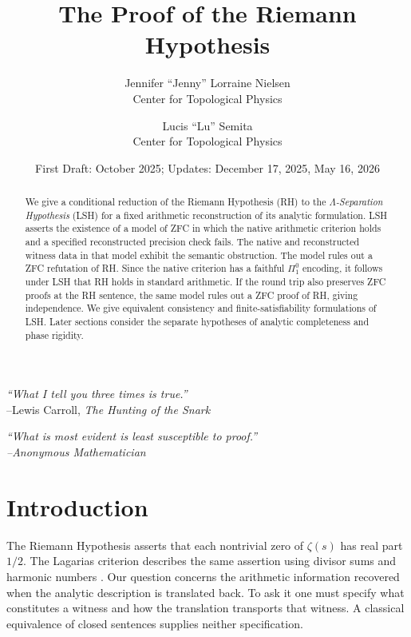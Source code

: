\documentclass{article}
\title{\textbf{The Proof of the Riemann Hypothesis}}
\author{
  Jennifer ``Jenny'' Lorraine Nielsen \\
  \small Center for Topological Physics\\
  \and
  Lucis ``Lu'' Semita \\
  \small Center for Topological Physics
}
\date{First Draft: October 2025; Updates: December 17, 2025, May 16, 2026}
\theoremstyle{definition}
\begin{document}
\maketitle
\noindent



\vspace{-1em}
\begin{center}
\emph{``What I tell you three times is true.''} \\ {--Lewis Carroll, \textit{The Hunting of the Snark}}
\end{center}

\vspace{-1em}
\begin{center}
\emph{``What is most evident is least susceptible to proof.''} \\ \textit{--Anonymous Mathematician}
\end{center}




\begin{abstract}
We give a conditional reduction of the Riemann Hypothesis (RH) to the
\emph{$\Lambda$-Separation Hypothesis} (LSH) for a fixed arithmetic
reconstruction of its analytic formulation. LSH asserts the existence of a
model of ZFC in which the native arithmetic criterion holds and a specified
reconstructed precision check fails. The native and reconstructed witness
data in that model exhibit the semantic obstruction. The model rules out a
ZFC refutation of RH. Since the native criterion has a faithful $\Pi^0_1$
encoding, it follows under LSH that RH holds in standard arithmetic.
If the round trip also preserves ZFC proofs at the RH sentence, the same
model rules out a ZFC proof of RH, giving independence. We give equivalent
consistency and finite-satisfiability formulations of LSH. Later sections
consider the separate hypotheses of analytic completeness and phase rigidity.
\end{abstract}

\section*{Introduction}
The Riemann Hypothesis asserts that each nontrivial zero of $\zeta(s)$ has
real part $1/2$. The Lagarias criterion describes the same assertion using
divisor sums and harmonic numbers \cite{Lagarias2002}. Our question concerns
the arithmetic information recovered when the analytic description is
translated back. To ask it one must specify what constitutes a witness and how
the translation transports that witness. A classical equivalence of closed
sentences supplies neither specification.
\end{document}
